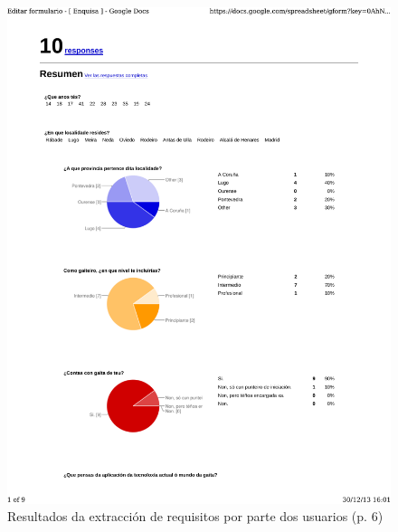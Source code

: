   \begin{figure}[htbp]
   \centering
   \includegraphics[scale=0.7,page=6,keepaspectratio=true]{./imagenes/enquisa.pdf}
   \caption{Resultados da extracción de requisitos por parte dos usuarios (p. 6)}
   \label{figura:ResultadosExtraccionRequisitosUsuarios6}
  \end{figure}

